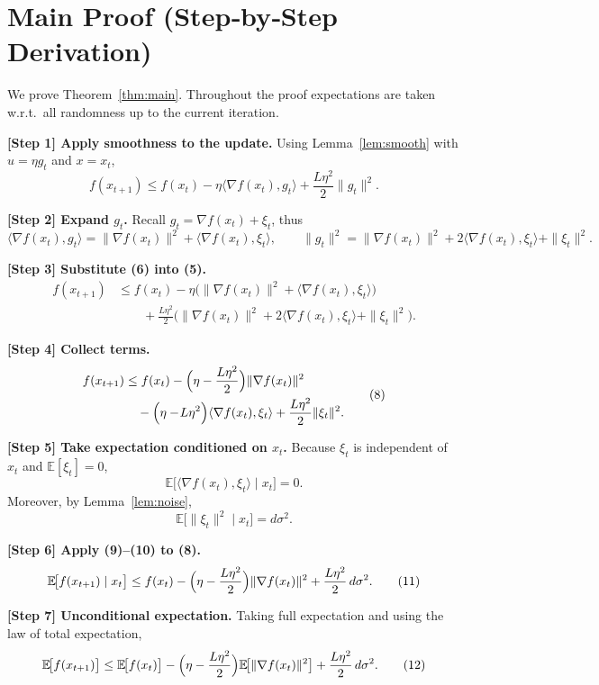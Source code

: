 \documentclass{article}
\newcommand{\E}{\mathbb{E}}
\begin{document}
\section*{Main Proof (Step‑by‑Step Derivation)}
We prove Theorem~\ref{thm:main}.  Throughout the proof expectations are
taken w.r.t.\ all randomness up to the current iteration.

\noindent\textbf{[Step 1] Apply smoothness to the update.}  
Using Lemma~\ref{lem:smooth} with $u=\eta g_{t}$ and $x=x_{t}$,
\[
f(x_{t+1})\le f(x_{t})-\eta\langle\nabla f(x_{t}),g_{t}\rangle
+\frac{L\eta^{2}}{2}\|g_{t}\|^{2}.
\tag{5}
\]

\noindent\textbf{[Step 2] Expand $g_{t}$.}  
Recall $g_{t}= \nabla f(x_{t})+\xi_{t}$, thus
\[
\langle\nabla f(x_{t}),g_{t}\rangle
= \|\nabla f(x_{t})\|^{2}+\langle\nabla f(x_{t}),\xi_{t}\rangle,
\qquad
\|g_{t}\|^{2}= \|\nabla f(x_{t})\|^{2}
+2\langle\nabla f(x_{t}),\xi_{t}\rangle+\|\xi_{t}\|^{2}.
\tag{6}
\]

\noindent\textbf{[Step 3] Substitute (6) into (5).}
\[
\begin{aligned}
f(x_{t+1})
&\le f(x_{t})
-\eta\bigl(\|\nabla f(x_{t})\|^{2}+\langle\nabla f(x_{t}),\xi_{t}\rangle\bigr) \\
&\qquad +\frac{L\eta^{2}}{2}
\bigl(\|\nabla f(x_{t})\|^{2}+2\langle\nabla f(x_{t}),\xi_{t}\rangle+\|\xi_{t}\|^{2}\bigr).
\end{aligned}
\tag{7}
\]

\noindent\textbf{[Step 4] Collect terms.}
\[
\begin{aligned}
f(x_{t+1})
&\le f(x_{t})
-\Bigl(\eta-\frac{L\eta^{2}}{2}\Bigr)\|\nabla f(x_{t})\|^{2}\\
&\quad -\Bigl(\eta-\!L\eta^{2}\Bigr)\langle\nabla f(x_{t}),\xi_{t}\rangle
+\frac{L\eta^{2}}{2}\|\xi_{t}\|^{2}.
\end{aligned}
\tag{8}
\]

\noindent\textbf{[Step 5] Take expectation conditioned on $x_{t}$.}  
Because $\xi_{t}$ is independent of $x_{t}$ and $\E[\xi_{t}]=0$,
\[
\E\!\bigl[\langle\nabla f(x_{t}),\xi_{t}\rangle\mid x_{t}\bigr]=0.
\tag{9}
\]
Moreover, by Lemma~\ref{lem:noise},
\[
\E\!\bigl[\|\xi_{t}\|^{2}\mid x_{t}\bigr]=d\sigma^{2}.
\tag{10}
\]

\noindent\textbf{[Step 6] Apply (9)–(10) to (8).}
\[
\E\!\bigl[f(x_{t+1})\mid x_{t}\bigr]
\le f(x_{t})-\Bigl(\eta-\frac{L\eta^{2}}{2}\Bigr)\|\nabla f(x_{t})\|^{2}
+\frac{L\eta^{2}}{2}\,d\sigma^{2}.
\tag{11}
\]

\noindent\textbf{[Step 7] Unconditional expectation.}  
Taking full expectation and using the law of total expectation,
\[
\E\!\bigl[f(x_{t+1})\bigr]
\le \E\!\bigl[f(x_{t})\bigr]
-\Bigl(\eta-\frac{L\eta^{2}}{2}\Bigr)\E\!\bigl[\|\nabla f(x_{t})\|^{2}\bigr]
+\frac{L\eta^{2}}{2}\,d\sigma^{2}.
\tag{12}
\]
\end{document}
